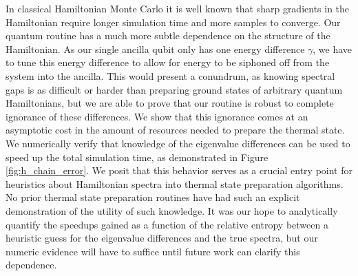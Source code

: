 In classical Hamiltonian Monte Carlo it is well known that sharp gradients in the Hamiltonian require longer simulation time and more samples to converge. Our quantum routine has a much more subtle dependence on the structure of the Hamiltonian. As our single ancilla qubit only has one energy difference $\gamma$, we have to tune this energy difference to allow for energy to be siphoned off from the system into the ancilla. This would present a conundrum, as knowing spectral gaps is as difficult or harder than preparing ground states of arbitrary quantum Hamiltonians, but we are able to prove that our routine is robust to complete ignorance of these differences. We show that this ignorance comes at an asymptotic cost in the amount of resources needed to prepare the thermal state. We numerically verify that knowledge of the eigenvalue differences can be used to speed up the total simulation time, as demonstrated in Figure \ref{fig:h_chain_error}. We posit that this behavior serves as a crucial entry point for heuristics about Hamiltonian spectra into thermal state preparation algorithms. No prior thermal state preparation routines have had such an explicit demonstration of the utility of such knowledge. It was our hope to analytically quantify the speedups gained as a function of the relative entropy between a heuristic guess for the eigenvalue differences and the true spectra, but our numeric evidence will have to suffice until future work can clarify this dependence.

